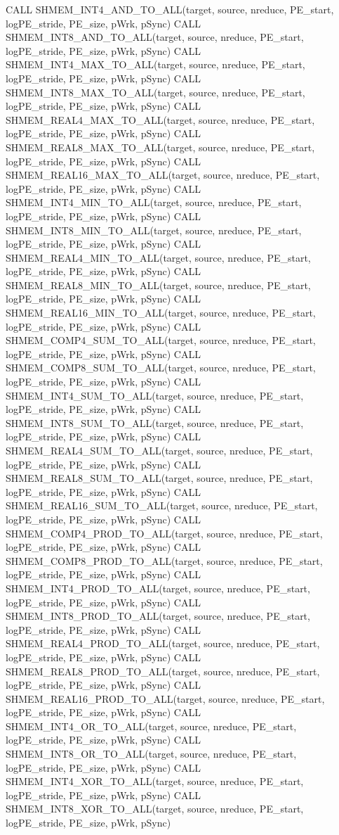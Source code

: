 CALL SHMEM_INT4_AND_TO_ALL(target, source, nreduce, PE_start, logPE_stride, PE_size, pWrk, pSync)
CALL SHMEM_INT8_AND_TO_ALL(target, source, nreduce, PE_start, logPE_stride, PE_size, pWrk, pSync)
CALL SHMEM_INT4_MAX_TO_ALL(target, source, nreduce, PE_start, logPE_stride, PE_size, pWrk, pSync)
CALL SHMEM_INT8_MAX_TO_ALL(target, source, nreduce, PE_start, logPE_stride, PE_size, pWrk, pSync)
CALL SHMEM_REAL4_MAX_TO_ALL(target, source, nreduce, PE_start, logPE_stride, PE_size, pWrk, pSync)
CALL SHMEM_REAL8_MAX_TO_ALL(target, source, nreduce, PE_start, logPE_stride, PE_size, pWrk, pSync)
CALL SHMEM_REAL16_MAX_TO_ALL(target, source, nreduce, PE_start, logPE_stride, PE_size, pWrk, pSync)
CALL SHMEM_INT4_MIN_TO_ALL(target, source, nreduce, PE_start, logPE_stride, PE_size, pWrk, pSync)
CALL SHMEM_INT8_MIN_TO_ALL(target, source, nreduce, PE_start, logPE_stride, PE_size, pWrk, pSync)
CALL SHMEM_REAL4_MIN_TO_ALL(target, source, nreduce, PE_start, logPE_stride, PE_size, pWrk, pSync)
CALL SHMEM_REAL8_MIN_TO_ALL(target, source, nreduce, PE_start, logPE_stride, PE_size, pWrk, pSync)
CALL SHMEM_REAL16_MIN_TO_ALL(target, source, nreduce, PE_start, logPE_stride, PE_size, pWrk, pSync)
CALL SHMEM_COMP4_SUM_TO_ALL(target, source, nreduce, PE_start, logPE_stride, PE_size, pWrk, pSync)
CALL SHMEM_COMP8_SUM_TO_ALL(target, source, nreduce, PE_start, logPE_stride, PE_size, pWrk, pSync)
CALL SHMEM_INT4_SUM_TO_ALL(target, source, nreduce, PE_start, logPE_stride, PE_size, pWrk, pSync)
CALL SHMEM_INT8_SUM_TO_ALL(target, source, nreduce, PE_start, logPE_stride, PE_size, pWrk, pSync)
CALL SHMEM_REAL4_SUM_TO_ALL(target, source, nreduce, PE_start, logPE_stride, PE_size, pWrk, pSync)
CALL SHMEM_REAL8_SUM_TO_ALL(target, source, nreduce, PE_start, logPE_stride, PE_size, pWrk, pSync)
CALL SHMEM_REAL16_SUM_TO_ALL(target, source, nreduce, PE_start, logPE_stride, PE_size, pWrk, pSync)
CALL SHMEM_COMP4_PROD_TO_ALL(target, source, nreduce, PE_start, logPE_stride, PE_size, pWrk, pSync)
CALL SHMEM_COMP8_PROD_TO_ALL(target, source, nreduce, PE_start, logPE_stride, PE_size, pWrk, pSync)
CALL SHMEM_INT4_PROD_TO_ALL(target, source, nreduce, PE_start, logPE_stride, PE_size, pWrk, pSync)
CALL SHMEM_INT8_PROD_TO_ALL(target, source, nreduce, PE_start, logPE_stride, PE_size, pWrk, pSync)
CALL SHMEM_REAL4_PROD_TO_ALL(target, source, nreduce, PE_start, logPE_stride, PE_size, pWrk, pSync)
CALL SHMEM_REAL8_PROD_TO_ALL(target, source, nreduce, PE_start, logPE_stride, PE_size, pWrk, pSync)
CALL SHMEM_REAL16_PROD_TO_ALL(target, source, nreduce, PE_start, logPE_stride, PE_size, pWrk, pSync)
CALL SHMEM_INT4_OR_TO_ALL(target, source, nreduce, PE_start, logPE_stride, PE_size, pWrk, pSync)
CALL SHMEM_INT8_OR_TO_ALL(target, source, nreduce, PE_start, logPE_stride, PE_size, pWrk, pSync)	
CALL SHMEM_INT4_XOR_TO_ALL(target, source, nreduce, PE_start, logPE_stride, PE_size, pWrk, pSync)
CALL SHMEM_INT8_XOR_TO_ALL(target, source, nreduce, PE_start, logPE_stride, PE_size, pWrk, pSync) %

